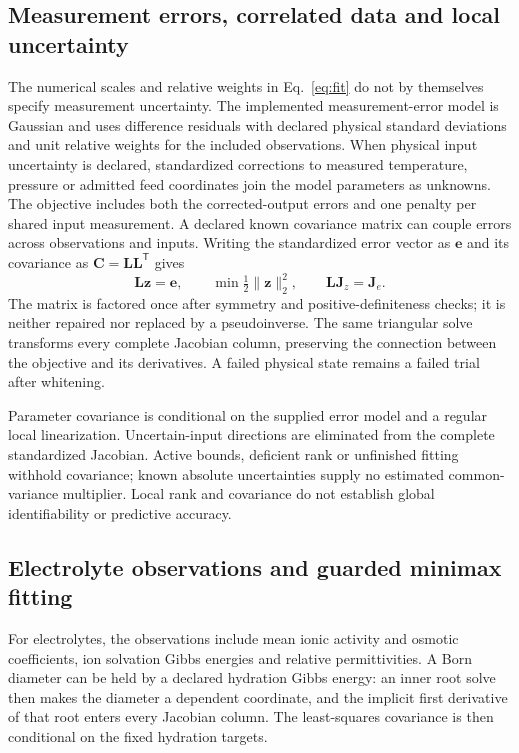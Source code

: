 \subsection{Measurement errors, correlated data and local uncertainty}
The numerical scales and relative weights in Eq.~\eqref{eq:fit} do not by themselves specify measurement uncertainty.
The implemented measurement-error model is Gaussian and uses difference residuals with declared physical standard deviations and unit relative weights for the included observations.
When physical input uncertainty is declared, standardized corrections to measured temperature, pressure or admitted feed coordinates join the model parameters as unknowns.
The objective includes both the corrected-output errors and one penalty per shared input measurement.
A declared known covariance matrix can couple errors across observations and inputs.
Writing the standardized error vector as $\mathbf{e}$ and its covariance as $\mathbf{C}=\mathbf{L}\mathbf{L}^{\mathsf T}$ gives
\begin{equation}
\mathbf{L}\mathbf{z}=\mathbf{e},\qquad
\min\tfrac12\|\mathbf{z}\|_2^2,\qquad
\mathbf{L}\mathbf{J}_{z}=\mathbf{J}_{e}.
\label{eq:whitening}
\end{equation}
The matrix is factored once after symmetry and positive-definiteness checks; it is neither repaired nor replaced by a pseudoinverse.
The same triangular solve transforms every complete Jacobian column, preserving the connection between the objective and its derivatives.
A failed physical state remains a failed trial after whitening.

Parameter covariance is conditional on the supplied error model and a regular local linearization.
Uncertain-input directions are eliminated from the complete standardized Jacobian.
Active bounds, deficient rank or unfinished fitting withhold covariance; known absolute uncertainties supply no estimated common-variance multiplier.
Local rank and covariance do not establish global identifiability or predictive accuracy.


\subsection{Electrolyte observations and guarded minimax fitting}
For electrolytes, the observations include mean ionic activity and osmotic coefficients, ion solvation Gibbs energies and relative permittivities.
A Born diameter can be held by a declared hydration Gibbs energy: an inner root solve then makes the diameter a dependent coordinate, and the implicit first derivative of that root enters every Jacobian column.
The least-squares covariance is then conditional on the fixed hydration targets.


